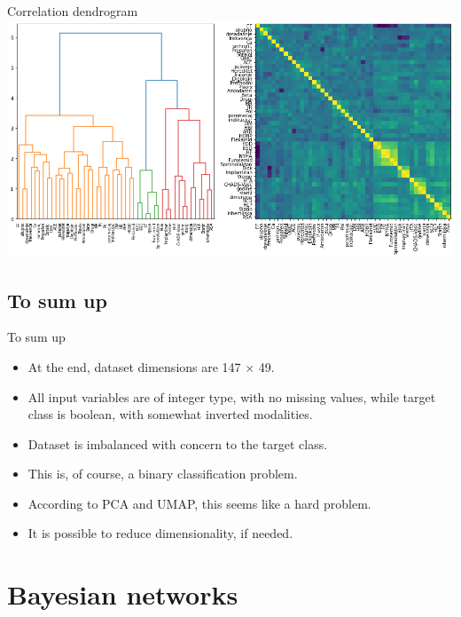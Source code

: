 \documentclass[hyperref={bookmarks=false}]{beamer}
\begin{document}
\begin{frame}{Correlation dendrogram}
\includegraphics[width=\textwidth]{../slike/dendro.png}
\end{frame}

\subsection{To sum up}
\begin{frame}{To sum up}
\begin{itemize}
    \item At the end, dataset dimensions are 147 × 49.

    \item All input variables are of integer type, with no missing values, while target class is boolean, with somewhat inverted modalities.

    \item Dataset is imbalanced with concern to the target class.

    \item This is, of course, a binary classification problem.

    \item According to PCA and UMAP, this seems like a hard problem.
    
    \item It is possible to reduce dimensionality, if needed.
\end{itemize}
\end{frame}

\section{Bayesian networks}
\end{document}
